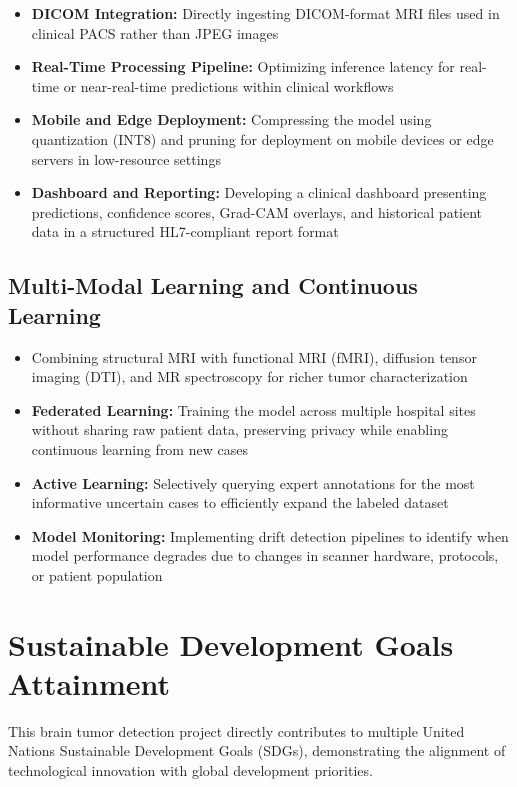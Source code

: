 \documentclass[12pt,a4paper]{article}
\begin{document}
\begin{itemize}
    \item \textbf{DICOM Integration:} Directly ingesting DICOM-format MRI files used in clinical PACS rather than JPEG images
    \item \textbf{Real-Time Processing Pipeline:} Optimizing inference latency for real-time or near-real-time predictions within clinical workflows
    \item \textbf{Mobile and Edge Deployment:} Compressing the model using quantization (INT8) and pruning for deployment on mobile devices or edge servers in low-resource settings
    \item \textbf{Dashboard and Reporting:} Developing a clinical dashboard presenting predictions, confidence scores, Grad-CAM overlays, and historical patient data in a structured HL7-compliant report format
\end{itemize}

\subsection{Multi-Modal Learning and Continuous Learning}

\begin{itemize}
    \item Combining structural MRI with functional MRI (fMRI), diffusion tensor imaging (DTI), and MR spectroscopy for richer tumor characterization
    \item \textbf{Federated Learning:} Training the model across multiple hospital sites without sharing raw patient data, preserving privacy while enabling continuous learning from new cases
    \item \textbf{Active Learning:} Selectively querying expert annotations for the most informative uncertain cases to efficiently expand the labeled dataset
    \item \textbf{Model Monitoring:} Implementing drift detection pipelines to identify when model performance degrades due to changes in scanner hardware, protocols, or patient population
\end{itemize}

\newpage

\section{Sustainable Development Goals Attainment}

This brain tumor detection project directly contributes to multiple United Nations Sustainable Development Goals (SDGs), demonstrating the alignment of technological innovation with global development priorities.
\end{document}

